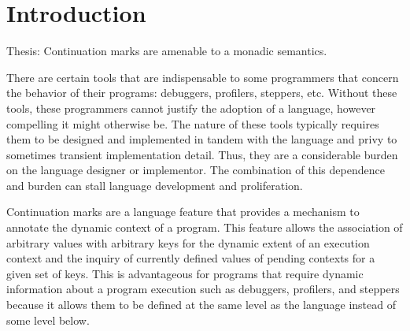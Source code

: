 \documentclass[ms]{byuprop}
\begin{document}
\maketitle



\section{Introduction}


Thesis: Continuation marks are amenable to a monadic semantics.


There are certain tools that are indispensable to some programmers that concern the
behavior of their programs: debuggers, profilers, steppers, etc. Without these tools,
these programmers cannot justify the adoption of a language, however compelling it might
otherwise be. The nature of these tools typically requires them to be designed and
implemented in tandem with the language and privy to sometimes transient implementation
detail. Thus, they are a considerable burden on the language designer or implementor. The
combination of this dependence and burden can stall language development and proliferation.

Continuation marks \cite{clements2006portable} are a language feature that provides a
mechanism to annotate the dynamic context of a program. This feature allows the
association of arbitrary values with arbitrary keys for the dynamic extent of an execution
context and the inquiry of currently defined values of pending contexts for a given set of
keys. This is advantageous for programs that require dynamic information about a program
execution such as debuggers, profilers, and steppers because it allows them to be defined
at the same level as the language instead of some level below.


\end{document}
